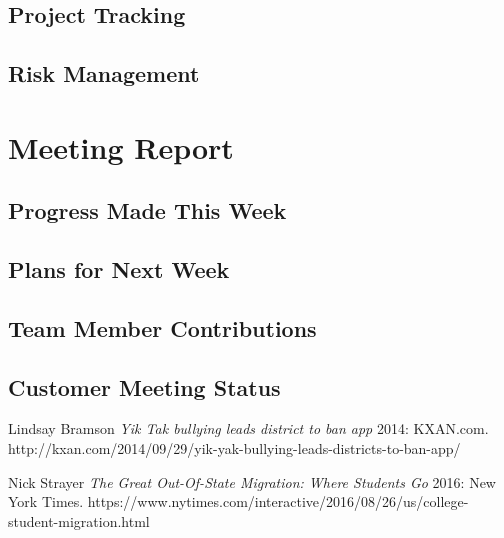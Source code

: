 \documentclass[12pt]{article}
\begin{document}
\subsection{Project Tracking}
\subsection{Risk Management}


\section{Meeting Report}

\subsection{Progress Made This Week}
\subsection{Plans for Next Week}
\subsection{Team Member Contributions}
\subsection{Customer Meeting Status}

\newpage
  \begin{thebibliography}{1}

   Lindsay Bramson {\em Yik Tak bullying leads district to ban app}  2014: KXAN.com. http://kxan.com/2014/09/29/yik-yak-bullying-leads-districts-to-ban-app/

    Nick Strayer {\em The Great Out-Of-State Migration: Where Students Go} 2016:
  New York Times. https://www.nytimes.com/interactive/2016/08/26/us/college-student-migration.html

  \end{thebibliography}
\end{document}
